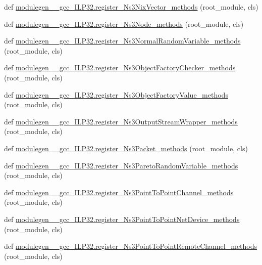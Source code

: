 \begin{DoxyCompactItemize}
\item 
def \hyperlink{namespacemodulegen____gcc__ILP32_a9b2d434ab0f4ea1d861923f9a09be052}{modulegen\+\_\+\+\_\+gcc\+\_\+\+I\+L\+P32.\+register\+\_\+\+Ns3\+Nix\+Vector\+\_\+methods} (root\+\_\+module, cls)
\item 
def \hyperlink{namespacemodulegen____gcc__ILP32_a2500f4dcd70d582b086c6ce23502e83c}{modulegen\+\_\+\+\_\+gcc\+\_\+\+I\+L\+P32.\+register\+\_\+\+Ns3\+Node\+\_\+methods} (root\+\_\+module, cls)
\item 
def \hyperlink{namespacemodulegen____gcc__ILP32_a19dba5e985f333f3aaf4f9a23c36edad}{modulegen\+\_\+\+\_\+gcc\+\_\+\+I\+L\+P32.\+register\+\_\+\+Ns3\+Normal\+Random\+Variable\+\_\+methods} (root\+\_\+module, cls)
\item 
def \hyperlink{namespacemodulegen____gcc__ILP32_aee073757310c9de4d2861b5c4b4eee5c}{modulegen\+\_\+\+\_\+gcc\+\_\+\+I\+L\+P32.\+register\+\_\+\+Ns3\+Object\+Factory\+Checker\+\_\+methods} (root\+\_\+module, cls)
\item 
def \hyperlink{namespacemodulegen____gcc__ILP32_a7505caf7d909001e889b89ce94143f4a}{modulegen\+\_\+\+\_\+gcc\+\_\+\+I\+L\+P32.\+register\+\_\+\+Ns3\+Object\+Factory\+Value\+\_\+methods} (root\+\_\+module, cls)
\item 
def \hyperlink{namespacemodulegen____gcc__ILP32_a8e9fcb242da1166eddf53267a12bfdbb}{modulegen\+\_\+\+\_\+gcc\+\_\+\+I\+L\+P32.\+register\+\_\+\+Ns3\+Output\+Stream\+Wrapper\+\_\+methods} (root\+\_\+module, cls)
\item 
def \hyperlink{namespacemodulegen____gcc__ILP32_ac954ddbcc06ada408c4168d841f1ac53}{modulegen\+\_\+\+\_\+gcc\+\_\+\+I\+L\+P32.\+register\+\_\+\+Ns3\+Packet\+\_\+methods} (root\+\_\+module, cls)
\item 
def \hyperlink{namespacemodulegen____gcc__ILP32_aeeb1ab9a764c8ee20760d96f553b05e6}{modulegen\+\_\+\+\_\+gcc\+\_\+\+I\+L\+P32.\+register\+\_\+\+Ns3\+Pareto\+Random\+Variable\+\_\+methods} (root\+\_\+module, cls)
\item 
def \hyperlink{namespacemodulegen____gcc__ILP32_ad7f4db36b3c4de322c560ff1e89e5182}{modulegen\+\_\+\+\_\+gcc\+\_\+\+I\+L\+P32.\+register\+\_\+\+Ns3\+Point\+To\+Point\+Channel\+\_\+methods} (root\+\_\+module, cls)
\item 
def \hyperlink{namespacemodulegen____gcc__ILP32_a7958c155bd63c680f7522f8d11ad95d4}{modulegen\+\_\+\+\_\+gcc\+\_\+\+I\+L\+P32.\+register\+\_\+\+Ns3\+Point\+To\+Point\+Net\+Device\+\_\+methods} (root\+\_\+module, cls)
\item 
def \hyperlink{namespacemodulegen____gcc__ILP32_a88a7fddf2d068ced67c43c03e82331b4}{modulegen\+\_\+\+\_\+gcc\+\_\+\+I\+L\+P32.\+register\+\_\+\+Ns3\+Point\+To\+Point\+Remote\+Channel\+\_\+methods} (root\+\_\+module, cls)

\end{DoxyCompactItemize}
